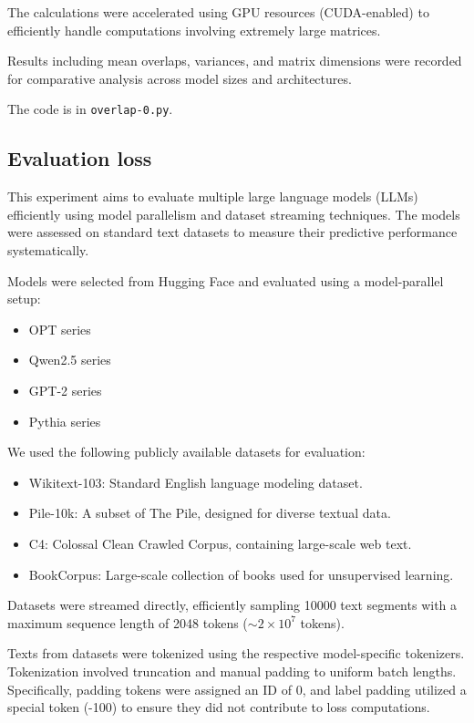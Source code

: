 \documentclass{article}
\begin{document}
The calculations were accelerated using GPU resources (CUDA-enabled) to efficiently handle computations involving extremely large matrices.

Results including mean overlaps, variances, and matrix dimensions were recorded for comparative analysis across model sizes and architectures.

The code is in \texttt{overlap-0.py}.

\subsection{Evaluation loss}\label{app:LLMloss}

This experiment aims to evaluate multiple large language models (LLMs) efficiently using model parallelism and dataset streaming techniques. The models were assessed on standard text datasets to measure their predictive performance systematically.

Models were selected from Hugging Face and evaluated using a model-parallel setup:
\begin{itemize}
    \item OPT series
    \item Qwen2.5 series
    \item GPT-2 series
    \item Pythia series
\end{itemize}

We used the following publicly available datasets for evaluation:
\begin{itemize}
    \item Wikitext-103: Standard English language modeling dataset.
    \item Pile-10k: A subset of The Pile, designed for diverse textual data.
    \item C4: Colossal Clean Crawled Corpus, containing large-scale web text.
    \item BookCorpus: Large-scale collection of books used for unsupervised learning.
\end{itemize}

Datasets were streamed directly, efficiently sampling 10000 text segments with a maximum sequence length of 2048 tokens (\(\sim 2 \times 10^7\) tokens).

Texts from datasets were tokenized using the respective model-specific tokenizers. Tokenization involved truncation and manual padding to uniform batch lengths. Specifically, padding tokens were assigned an ID of 0, and label padding utilized a special token (-100) to ensure they did not contribute to loss computations.
\end{document}
